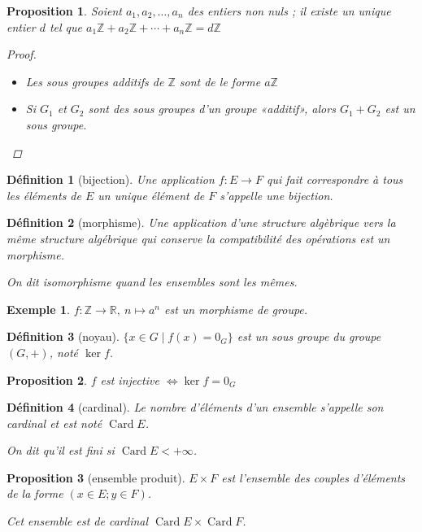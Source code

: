 \documentclass[french]{article}
\newtheorem{definition}{Définition}
\newtheorem{proposition}{Proposition}
\newtheorem{exemple}{Exemple}
\newcommand{\R}{\mathbb{R}}
\newcommand{\Z}{\mathbb{Z}}
\begin{document}
  \begin{proposition}
    Soient $a_1, a_2, …, a_n$ des entiers non nuls ; il existe un unique
    entier $d$ tel que $a_1\Z + a_2\Z + \cdots + a_n\Z = d\Z$
    \begin{proof}
      \begin{itemize}
        \item Les sous groupes additifs de $\Z$ sont de le forme $a\Z$
        \item Si $G_1$ et $G_2$ sont des sous groupes d'un groupe
          «additif», alors $G_1 + G_2$ est un sous groupe.
      \end{itemize}
    \end{proof}
  \end{proposition}

  \begin{definition}[bijection]
    Une application $f:E\to F$ qui fait correspondre à tous les éléments
    de $E$ un unique élément de $F$ s'appelle une bijection.
  \end{definition}
  \begin{definition}[morphisme]
    Une application d'une structure algèbrique vers la même structure
    algébrique qui conserve la compatibilité des opérations est un
    morphisme.

    On dit isomorphisme quand les ensembles sont les mêmes.
  \end{definition}
  \begin{exemple}
    $f:\Z\to\R,\ n\mapsto a^n$ est un morphisme de groupe.
  \end{exemple}
  \begin{definition}[noyau]
    $\lbrace x\in G \mid f(x) = 0_G \rbrace$ est un sous groupe du
    groupe $(G,+)$, noté $\ker f$.
  \end{definition}
  \begin{proposition}
    $f$ est injective $\iff \ker f = {0_G}$
  \end{proposition}
  \begin{definition}[cardinal]
    Le nombre d'éléments d'un ensemble s'appelle son cardinal et est
    noté $\mathop{Card} E$.

    On dit qu'il est fini si $\mathop{Card} E < +\infty$.
  \end{definition}
  \begin{proposition}[ensemble produit]
    $E\times F$ est l'ensemble des couples d'éléments de la forme $(x\in
    E; y\in F)$.

    Cet ensemble est de cardinal $\mathop{Card} E \times \mathop{Card}
    F$.
  \end{proposition}
\end{document}
